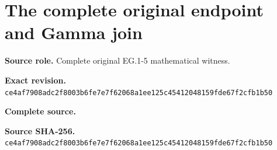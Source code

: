 \begingroup
\sloppy
\small
\clearpage
\section{The complete original endpoint and Gamma join}
\noindent\textbf{Source role.} Complete original EG.1-5 mathematical witness.\par
\noindent\textbf{Exact revision.} \nolinkurl{ce4af7908adc2f8003b6fe7e7f62068a1ee125c45412048159fde67f2cfb1b50}\par
\noindent\textbf{Complete source.} \par
\noindent\textbf{Source SHA-256.} \nolinkurl{ce4af7908adc2f8003b6fe7e7f62068a1ee125c45412048159fde67f2cfb1b50}\par\medskip

\endgroup
